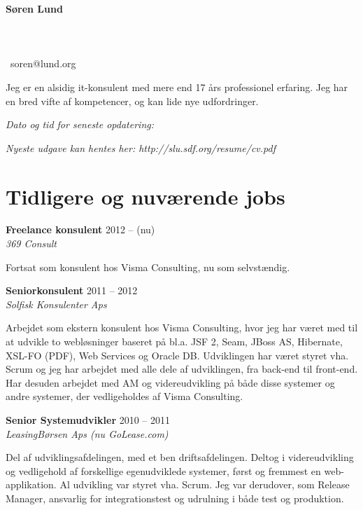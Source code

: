 \documentclass[a4paper,11pt]{article}
\newcommand\redacted{[skjult i online version]}
\newcommand\myaddressone{\redacted}
\newcommand\myaddresstwo{\redacted}
\newcommand\myphone{\redacted}
\begin{document}
\centerline{}
\bigskip

\begin{minipage}[b]{0.30\textwidth}
  \selectfont%
  \textbf{Søren Lund} \\
  \myaddressone \\
  \myaddresstwo \\
  \myphone \\
  \Email\ soren@lund.org
\end{minipage}%
\hfill
\begin{minipage}[b]{0.30\textwidth}
  \selectfont%
  Jeg er en alsidig it-konsulent med
  mere end 17 års professionel
  erfaring. Jeg har en bred vifte af
  kompetencer, og
  kan lide nye udfordringer.
\end{minipage}

\bigskip
\centerline{\small\textit{Dato og tid for seneste opdatering: }}
\centerline{\small\textit{Nyeste udgave kan hentes her: http://slu.sdf.org/resume/cv.pdf}}

\section*{Tidligere og nuværende jobs}

\textbf{Freelance konsulent} \hfill 2012 -- (nu) \\
\textsl{369 Consult}

Fortsat som konsulent hos Visma Consulting, nu som selvstændig.

\smallskip

\textbf{Seniorkonsulent} \hfill 2011 -- 2012 \\
\textsl{Solfisk Konsulenter Aps}

Arbejdet som ekstern konsulent hos Visma Consulting, hvor jeg har
været med til at udvikle to webløsninger baseret på bl.a. JSF 2, Seam,
JBoss AS, Hibernate, XSL-FO (PDF), Web Services og Oracle
DB. Udviklingen har været styret vha. Scrum og jeg har arbejdet med
alle dele af udviklingen, fra back-end til front-end.  Har desuden
arbejdet med AM og videreudvikling på både disse systemer og andre
systemer, der vedligeholdes af Visma Consulting.

\smallskip

\textbf{Senior Systemudvikler} \hfill 2010 -- 2011 \\
\textsl{LeasingBørsen Aps (nu GoLease.com)}

Del af udviklingsafdelingen, med et ben driftsafdelingen. Deltog i
videreudvikling og vedligehold af forskellige egenudviklede systemer,
først og fremmest en web-applikation. Al udvikling var styret
vha. Scrum. Jeg var derudover, som Release Manager, ansvarlig for
integrationstest og udrulning i både test og produktion.
\end{document}
